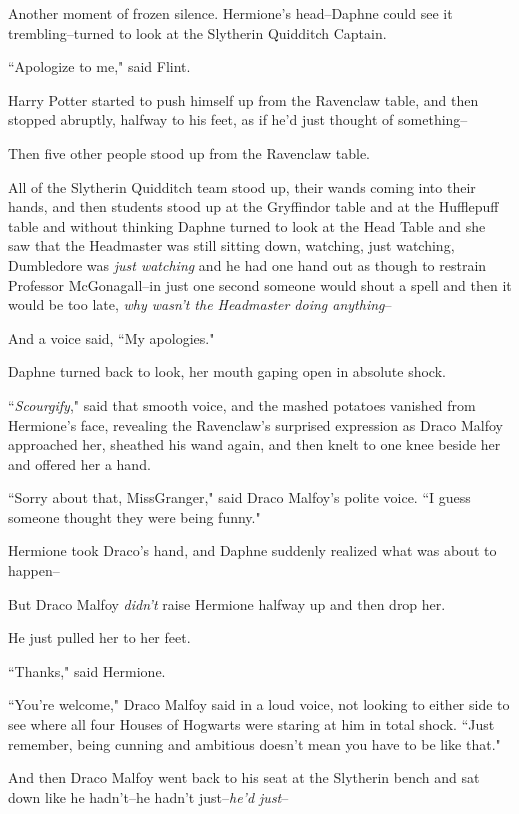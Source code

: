 Another moment of frozen silence. Hermione's head\---Daphne could see it trembling\---turned to look at the Slytherin Quidditch Captain.

``Apologize to me," said Flint.

Harry Potter started to push himself up from the Ravenclaw table, and then stopped abruptly, halfway to his feet, as if he'd just thought of something\---

Then five other people stood up from the Ravenclaw table.

All of the Slytherin Quidditch team stood up, their wands coming into their hands, and then students stood up at the Gryffindor table and at the Hufflepuff table and without thinking Daphne turned to look at the Head Table and she saw that the Headmaster was still sitting down, watching, just watching, Dumbledore was \emph{just watching} and he had one hand out as though to restrain Professor McGonagall\---in just one second someone would shout a spell and then it would be too late, \emph{why wasn't the Headmaster doing anything}\---

And a voice said, ``My apologies."

Daphne turned back to look, her mouth gaping open in absolute shock.

``\emph{Scourgify}," said that smooth voice, and the mashed potatoes vanished from Hermione's face, revealing the Ravenclaw's surprised expression as Draco Malfoy approached her, sheathed his wand again, and then knelt to one knee beside her and offered her a hand.

``Sorry about that, Miss\?Granger," said Draco Malfoy's polite voice. ``I guess someone thought they were being funny."

Hermione took Draco's hand, and Daphne suddenly realized what was about to happen\---

But Draco Malfoy \emph{didn't} raise Hermione halfway up and then drop her.

He just pulled her to her feet.

``Thanks," said Hermione.

``You're welcome," Draco Malfoy said in a loud voice, not looking to either side to see where all four Houses of Hogwarts were staring at him in total shock. ``Just remember, being cunning and ambitious doesn't mean you have to be like that."

And then Draco Malfoy went back to his seat at the Slytherin bench and sat down like he hadn't\---he hadn't just\---\emph{he'd just}\---

